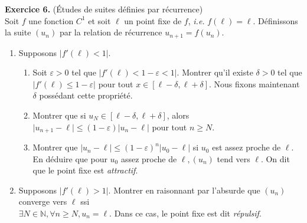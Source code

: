 \documentclass[a4paper, 10pt]{report}
\providecommand{\abs}[1]{\lvert#1\rvert}
\begin{document}
	\noindent
	\textbf{Exercice 6.} (Études de suites définies par récurrence)\\
	Soit $f$ une fonction $C^1$ et soit $\ell$ un point fixe de $f$,
	\textit{i.e.} $f(\ell) = \ell$. Définissons la suite $(u_n)$ par
	la relation de récurrence $u_{n+1} = f(u_n)$.
	\begin{enumerate}[label=(\roman*)]
		\item Supposons $\abs{f'(\ell) < 1}$.
		\begin{enumerate}[label=(\alph*)]
			\item Soit $\varepsilon > 0$ tel que
			$\abs{f'(\ell) < 1 - \varepsilon < 1}$. Montrer qu'il existe
			$\delta > 0$ tel que $\abs{f'(\ell) \leq 1 - \varepsilon}$
			pour tout $x \in [\ell - \delta, \ell + \delta]$. Nous fixons
			maintenant $\delta$ possédant cette propriété.
			\item Montrer que si $u_N \in [\ell - \delta, \ell + \delta]$,
			alors
			$\abs{u_{n+1} - \ell} \leq (1 - \varepsilon)\abs{u_n - \ell}$
			pour tout $n \geq N$.
			\item Montrer que
			$\abs{u_n - \ell} \leq (1 - \varepsilon)^n\abs{u_0 - \ell}$ si
			$u_0$ est assez proche de $\ell$. En déduire que pour $u_0$
			assez proche de $\ell, (u_n)$ tend vers $\ell$. On dit que le
			point fixe est \textit{attractif}.
		\end{enumerate}
		\item Supposons $\abs{f'(\ell) > 1}$. Montrer en raisonnant
		par l'absurde que $(u_n)$ converge vers $\ell$ ssi\\
		$\exists N \in \mathbb{N}, \forall n \geq N, u_n = \ell$.
		Dans ce cas, le point fixe est dit \textit{répulsif}.
	\end{enumerate}
	
%	
%	
%	
	
\end{document}
